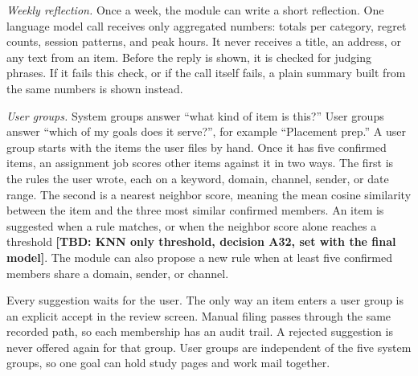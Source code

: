 \documentclass[conference]{IEEEtran}
\newcommand{\tbd}[1]{\textbf{[TBD: #1]}}
\begin{document}
\textit{Weekly reflection.} Once a week, the module can write a short reflection. One language model call receives only aggregated numbers: totals per category, regret counts, session patterns, and peak hours. It never receives a title, an address, or any text from an item. Before the reply is shown, it is checked for judging phrases. If it fails this check, or if the call itself fails, a plain summary built from the same numbers is shown instead.

\textit{User groups.} System groups answer ``what kind of item is this?'' User groups answer ``which of my goals does it serve?'', for example ``Placement prep.'' A user group starts with the items the user files by hand. Once it has five confirmed items, an assignment job scores other items against it in two ways. The first is the rules the user wrote, each on a keyword, domain, channel, sender, or date range. The second is a nearest neighbor score, meaning the mean cosine similarity between the item and the three most similar confirmed members. An item is suggested when a rule matches, or when the neighbor score alone reaches a threshold \tbd{KNN only threshold, decision A32, set with the final model}. The module can also propose a new rule when at least five confirmed members share a domain, sender, or channel.

Every suggestion waits for the user. The only way an item enters a user group is an explicit accept in the review screen. Manual filing passes through the same recorded path, so each membership has an audit trail. A rejected suggestion is never offered again for that group. User groups are independent of the five system groups, so one goal can hold study pages and work mail together.

\end{document}

